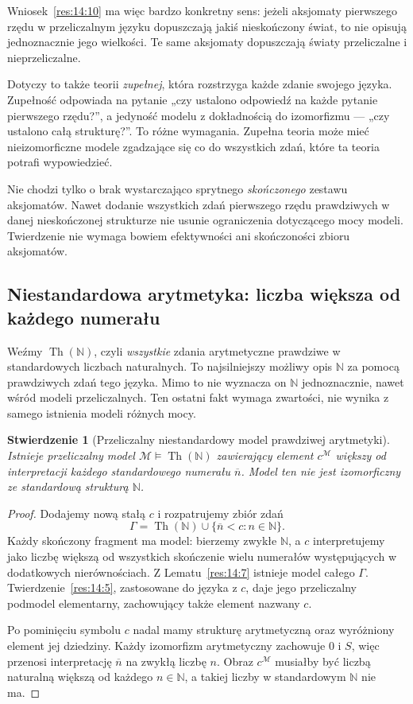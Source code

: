 \documentclass[11pt,a4paper]{article}
\numberwithin{equation}{section}
\theoremstyle{plain}
\newtheorem{stwierdzenie}[twierdzenie]{Stwierdzenie}
\theoremstyle{definition}
\theoremstyle{remark}
\begin{document}
Wniosek~\ref{res:14:10} ma więc bardzo konkretny sens: jeżeli aksjomaty pierwszego rzędu w przeliczalnym języku dopuszczają jakiś nieskończony świat, to nie opisują jednoznacznie jego wielkości. Te same aksjomaty dopuszczają światy przeliczalne i nieprzeliczalne.

Dotyczy to także teorii \emph{zupełnej}, która rozstrzyga każde zdanie swojego języka. Zupełność odpowiada na pytanie „czy ustalono odpowiedź na każde pytanie pierwszego rzędu?”, a jedyność modelu z dokładnością do izomorfizmu --- „czy ustalono całą strukturę?”. To różne wymagania. Zupełna teoria może mieć nieizomorficzne modele zgadzające się co do wszystkich zdań, które ta teoria potrafi wypowiedzieć.

Nie chodzi tylko o brak wystarczająco sprytnego \emph{skończonego} zestawu aksjomatów. Nawet dodanie wszystkich zdań pierwszego rzędu prawdziwych w danej nieskończonej strukturze nie usunie ograniczenia dotyczącego mocy modeli. Twierdzenie nie wymaga bowiem efektywności ani skończoności zbioru aksjomatów.

\subsection*{Niestandardowa arytmetyka: liczba większa od każdego numerału}\label{sec:15:2}
Weźmy $\operatorname{Th}(\mathbb N)$, czyli \emph{wszystkie} zdania arytmetyczne prawdziwe w standardowych liczbach naturalnych. To najsilniejszy możliwy opis $\mathbb N$ za pomocą prawdziwych zdań tego języka. Mimo to nie wyznacza on $\mathbb N$ jednoznacznie, nawet wśród modeli przeliczalnych. Ten ostatni fakt wymaga zwartości, nie wynika z samego istnienia modeli różnych mocy.

\begin{stwierdzenie}[Przeliczalny niestandardowy model prawdziwej arytmetyki]\label{res:15:1}
Istnieje przeliczalny model $\mathcal M\models\operatorname{Th}(\mathbb N)$ zawierający element $c^{\mathcal M}$ większy od interpretacji każdego standardowego numerału $\overline n$. Model ten nie jest izomorficzny ze standardową strukturą $\mathbb N$.
\end{stwierdzenie}
\begin{proof}
Dodajemy nową stałą $c$ i rozpatrujemy zbiór zdań
\[
\Gamma=\operatorname{Th}(\mathbb N)\cup\{\overline n<c:n\in\mathbb N\}.
\]
Każdy skończony fragment ma model: bierzemy zwykłe $\mathbb N$, a $c$ interpretujemy jako liczbę większą od wszystkich skończenie wielu numerałów występujących w dodatkowych nierównościach. Z Lematu~\ref{res:14:7} istnieje model całego $\Gamma$. Twierdzenie~\ref{res:14:5}, zastosowane do języka z $c$, daje jego przeliczalny podmodel elementarny, zachowujący także element nazwany $c$.

Po pominięciu symbolu $c$ nadal mamy strukturę arytmetyczną oraz wyróżniony element jej dziedziny. Każdy izomorfizm arytmetyczny zachowuje $0$ i $S$, więc przenosi interpretację $\overline n$ na zwykłą liczbę $n$. Obraz $c^{\mathcal M}$ musiałby być liczbą naturalną większą od każdego $n\in\mathbb N$, a takiej liczby w standardowym $\mathbb N$ nie ma.
\end{proof}
\end{document}
